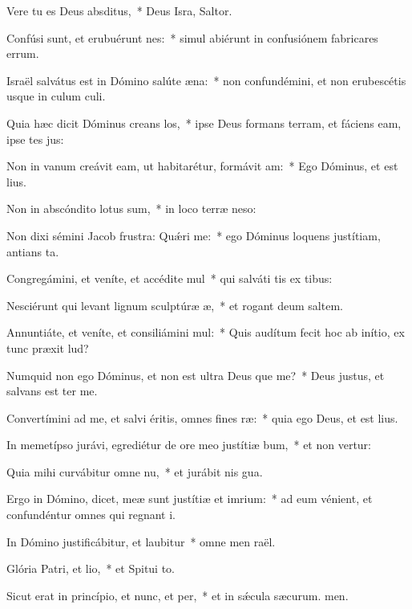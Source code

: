 \item Vere tu es Deus absditus,~* Deus Isra, Saltor.
\item Confúsi sunt, et erubuérunt nes:~* simul abiérunt in confusiónem fabricares errum.
\item Israël salvátus est in Dómino salúte æna:~* non confundémini, et non erubescétis usque in culum culi.
\item Quia hæc dicit Dóminus creans los,~* ipse Deus formans terram, et fáciens eam, ipse tes jus:
\item Non in vanum creávit eam, ut habitarétur, formávit am:~* Ego Dóminus, et  est lius.
\item Non in abscóndito lotus sum,~* in loco terræ neso:
\item Non dixi sémini Jacob frustra: Quǽri me:~* ego Dóminus loquens justítiam, antians ta.
\item Congregámini, et veníte, et accédite mul~* qui salváti tis ex tibus:
\item Nesciérunt qui levant lignum sculptúræ æ,~* et rogant deum  saltem.
\item Annuntiáte, et veníte, et consiliámini mul:~* Quis audítum fecit hoc ab inítio, ex tunc præxit lud?
\item Numquid non ego Dóminus, et non est ultra Deus que me?~* Deus justus, et salvans  est ter me.
\item Convertímini ad me, et salvi éritis, omnes fines ræ:~* quia ego Deus, et  est lius.
\item In memetípso jurávi, egrediétur de ore meo justítiæ bum,~* et non vertur:
\item Quia mihi curvábitur omne nu,~* et jurábit nis gua.
\item Ergo in Dómino, dicet, meæ sunt justítiæ et imrium:~* ad eum vénient, et confundéntur omnes qui regnant i.
\item In Dómino justificábitur, et laubitur~* omne men raël.
\item Glória Patri, et lio,~* et Spitui to.
\item Sicut erat in princípio, et nunc, et per,~* et in sǽcula sæcurum. men.
